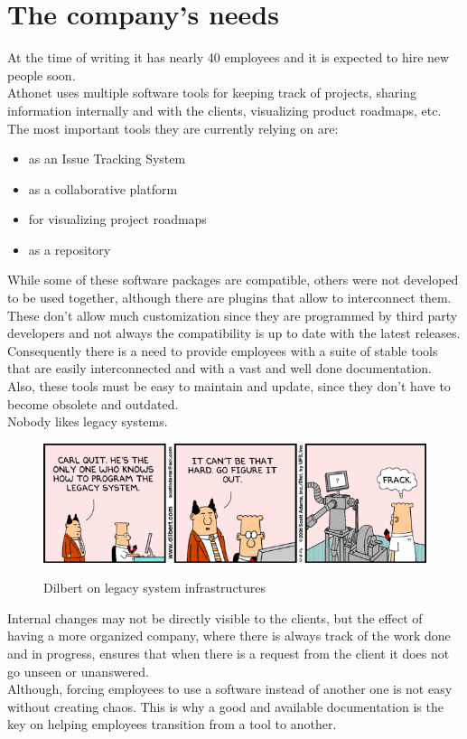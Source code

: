\section{The company's needs}
	At the time of writing it has nearly 40 employees and it is expected to hire new people soon.\\
	Athonet uses multiple software tools for keeping track of projects, sharing information internally and with the clients, visualizing \gls{product roadmaps}, etc.\\
	The most important tools they are currently relying on are:
	\begin{itemize}
		\item {}\cite{redmine} as an Issue Tracking System
		\item {}\cite{sharepoint} as a collaborative platform
		\item {}\cite{planner} for visualizing project roadmaps
		\item {}\cite{gitlab} as a \gls{repository}
	\end{itemize}
	While some of these software packages are compatible, others were not developed to be used together, although there are plugins that allow to interconnect them.
	These don't allow much customization since they are programmed by third party developers and not always the compatibility is up to date with the latest releases.\\
	Consequently there is a need to provide employees with a suite of stable tools that are easily interconnected and with a vast and well done documentation.
	Also, these tools must be easy to maintain and update, since they don't have to become obsolete and outdated.\\
	Nobody likes legacy systems.
	\begin{figure}[H]
		\centering
		\includegraphics[width=1\textwidth]{resources/legacy-code}\\
		\caption{Dilbert on legacy system infrastructures}
	\end{figure}
	Internal changes may not be directly visible to the clients, but the effect of having a more organized company, where there is always track of the work done and in progress, ensures that when there is a request from the client it does not go unseen or unanswered.\\
	Although, forcing employees to use a software instead of another one is not easy without creating chaos.
	This is why a good and available documentation is the key on helping employees transition from a tool to another.

